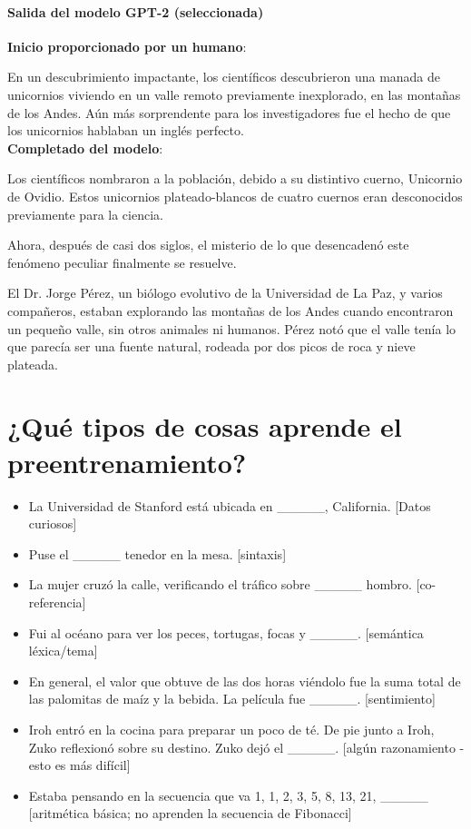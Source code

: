 \paragraph{Salida del modelo GPT-2 (seleccionada)}
\textbf{Inicio proporcionado por un humano}:

En un descubrimiento impactante, los científicos descubrieron una manada de unicornios viviendo en un valle remoto previamente inexplorado, en las montañas de los Andes. Aún más sorprendente para los investigadores fue el hecho de que los unicornios hablaban un inglés perfecto. \\
\textbf{Completado del modelo}:

Los científicos nombraron a la población, debido a su distintivo cuerno, Unicornio de Ovidio. Estos unicornios plateado-blancos de cuatro cuernos eran desconocidos previamente para la ciencia.

Ahora, después de casi dos siglos, el misterio de lo que desencadenó este fenómeno peculiar finalmente se resuelve.

El Dr. Jorge Pérez, un biólogo evolutivo de la Universidad de La Paz, y varios compañeros, estaban explorando las montañas de los Andes cuando encontraron un pequeño valle, sin otros animales ni humanos. Pérez notó que el valle tenía lo que parecía ser una fuente natural, rodeada por dos picos de roca y nieve plateada.


\section{¿Qué tipos de cosas aprende el preentrenamiento?}

\begin{itemize}
\item La Universidad de Stanford está ubicada en \_\_\_\_\_, California. [Datos curiosos]
\item Puse el \_\_\_\_\_ tenedor en la mesa. [sintaxis]
\item La mujer cruzó la calle, verificando el tráfico sobre \_\_\_\_\_ hombro. [co-referencia]
 \item Fui al océano para ver los peces, tortugas, focas y \_\_\_\_\_. [semántica léxica/tema]
\item En general, el valor que obtuve de las dos horas viéndolo fue la suma total de las palomitas de maíz y la bebida. La película fue \_\_\_\_\_. [sentimiento]
\item Iroh entró en la cocina para preparar un poco de té. De pie junto a Iroh, Zuko reflexionó sobre su destino. Zuko dejó el \_\_\_\_\_. [algún razonamiento - esto es más difícil]
\item Estaba pensando en la secuencia que va 1, 1, 2, 3, 5, 8, 13, 21, \_\_\_\_\_ [aritmética básica; no aprenden la secuencia de Fibonacci]
\end{itemize}


